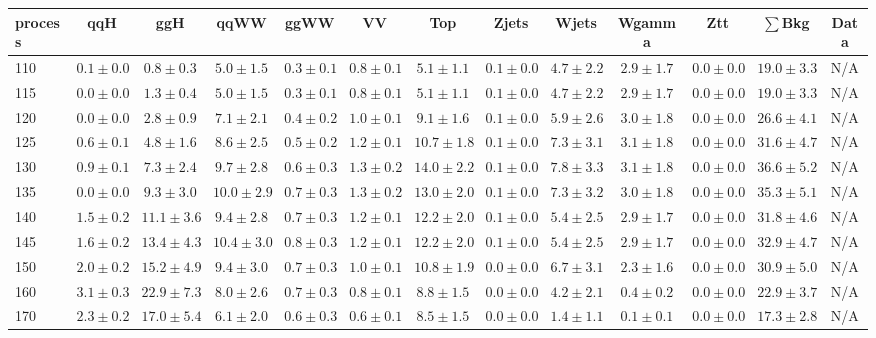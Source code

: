 \begin{table}
{%
 \tiny
 \begin{center}
 \begin{tabular}{l | c c | c c c c c c c c  | c c}
 \hline
 process & qqH & ggH & qqWW & ggWW & VV & Top & Zjets & Wjets & Wgamma & Ztt & $\sum$Bkg & Data \\
 \hline
110 & $0.1\pm0.0$ & $0.8\pm0.3$ & $5.0\pm1.5$ & $0.3\pm0.1$ & $0.8\pm0.1$ & $5.1\pm1.1$ & $0.1\pm0.0$ & $4.7\pm2.2$ & $2.9\pm1.7$ & $0.0\pm0.0$ & $19.0\pm3.3$ & N/A \\
115 & $0.0\pm0.0$ & $1.3\pm0.4$ & $5.0\pm1.5$ & $0.3\pm0.1$ & $0.8\pm0.1$ & $5.1\pm1.1$ & $0.1\pm0.0$ & $4.7\pm2.2$ & $2.9\pm1.7$ & $0.0\pm0.0$ & $19.0\pm3.3$ & N/A \\
120 & $0.0\pm0.0$ & $2.8\pm0.9$ & $7.1\pm2.1$ & $0.4\pm0.2$ & $1.0\pm0.1$ & $9.1\pm1.6$ & $0.1\pm0.0$ & $5.9\pm2.6$ & $3.0\pm1.8$ & $0.0\pm0.0$ & $26.6\pm4.1$ & N/A \\
125 & $0.6\pm0.1$ & $4.8\pm1.6$ & $8.6\pm2.5$ & $0.5\pm0.2$ & $1.2\pm0.1$ & $10.7\pm1.8$ & $0.1\pm0.0$ & $7.3\pm3.1$ & $3.1\pm1.8$ & $0.0\pm0.0$ & $31.6\pm4.7$ & N/A \\
130 & $0.9\pm0.1$ & $7.3\pm2.4$ & $9.7\pm2.8$ & $0.6\pm0.3$ & $1.3\pm0.2$ & $14.0\pm2.2$ & $0.1\pm0.0$ & $7.8\pm3.3$ & $3.1\pm1.8$ & $0.0\pm0.0$ & $36.6\pm5.2$ & N/A \\
135 & $0.0\pm0.0$ & $9.3\pm3.0$ & $10.0\pm2.9$ & $0.7\pm0.3$ & $1.3\pm0.2$ & $13.0\pm2.0$ & $0.1\pm0.0$ & $7.3\pm3.2$ & $3.0\pm1.8$ & $0.0\pm0.0$ & $35.3\pm5.1$ & N/A \\
140 & $1.5\pm0.2$ & $11.1\pm3.6$ & $9.4\pm2.8$ & $0.7\pm0.3$ & $1.2\pm0.1$ & $12.2\pm2.0$ & $0.1\pm0.0$ & $5.4\pm2.5$ & $2.9\pm1.7$ & $0.0\pm0.0$ & $31.8\pm4.6$ & N/A \\
145 & $1.6\pm0.2$ & $13.4\pm4.3$ & $10.4\pm3.0$ & $0.8\pm0.3$ & $1.2\pm0.1$ & $12.2\pm2.0$ & $0.1\pm0.0$ & $5.4\pm2.5$ & $2.9\pm1.7$ & $0.0\pm0.0$ & $32.9\pm4.7$ & N/A \\
150 & $2.0\pm0.2$ & $15.2\pm4.9$ & $9.4\pm3.0$ & $0.7\pm0.3$ & $1.0\pm0.1$ & $10.8\pm1.9$ & $0.0\pm0.0$ & $6.7\pm3.1$ & $2.3\pm1.6$ & $0.0\pm0.0$ & $30.9\pm5.0$ & N/A \\
160 & $3.1\pm0.3$ & $22.9\pm7.3$ & $8.0\pm2.6$ & $0.7\pm0.3$ & $0.8\pm0.1$ & $8.8\pm1.5$ & $0.0\pm0.0$ & $4.2\pm2.1$ & $0.4\pm0.2$ & $0.0\pm0.0$ & $22.9\pm3.7$ & N/A \\
170 & $2.3\pm0.2$ & $17.0\pm5.4$ & $6.1\pm2.0$ & $0.6\pm0.3$ & $0.6\pm0.1$ & $8.5\pm1.5$ & $0.0\pm0.0$ & $1.4\pm1.1$ & $0.1\pm0.1$ & $0.0\pm0.0$ & $17.3\pm2.8$ & N/A \\

\end{tabular}
\end{center}}
\end{table}
